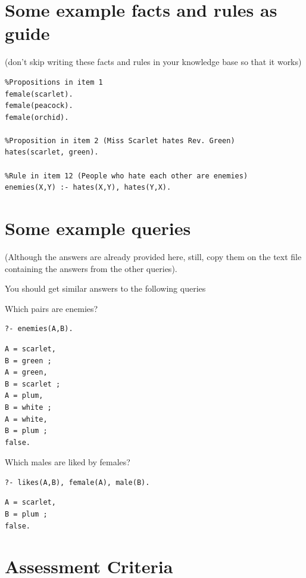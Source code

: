\section{Some example facts and rules as
guide}\label{lab-exercise-4-drama-in-the-clue-mansion.md__some-example-facts-and-rules-as-guide}

(don't skip writing these facts and rules in your knowledge base so that
it works)

\begin{verbatim}
%Propositions in item 1
female(scarlet).
female(peacock).
female(orchid).

%Proposition in item 2 (Miss Scarlet hates Rev. Green)
hates(scarlet, green).

%Rule in item 12 (People who hate each other are enemies)
enemies(X,Y) :- hates(X,Y), hates(Y,X).
\end{verbatim}

\section{Some example
queries}\label{lab-exercise-4-drama-in-the-clue-mansion.md__some-example-queries}

(Although the answers are already provided here, still, copy them on the
text file containing the answers from the other queries).

You should get similar answers to the following queries

Which pairs are enemies?

\begin{verbatim}
?- enemies(A,B).
\end{verbatim}

\begin{verbatim}
A = scarlet,
B = green ;
A = green,
B = scarlet ;
A = plum,
B = white ;
A = white,
B = plum ;
false.
\end{verbatim}

Which males are liked by females?

\begin{verbatim}
?- likes(A,B), female(A), male(B).
\end{verbatim}

\begin{verbatim}
A = scarlet,
B = plum ;
false.
\end{verbatim}

\section{Assessment
Criteria}\label{lab-exercise-4-drama-in-the-clue-mansion.md__assessment-criteria}

